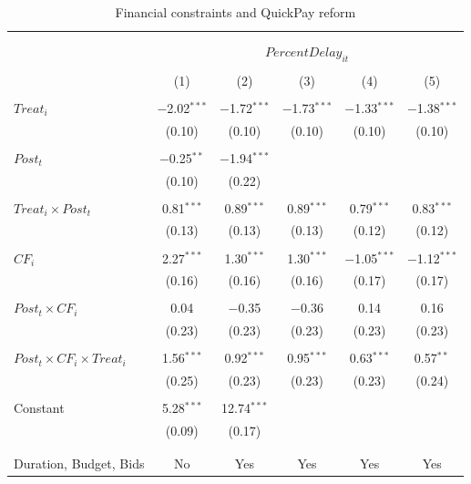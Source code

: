 \documentclass[
]{article}
\begin{document}
\begin{table}[H] \centering 
  \caption{Financial constraints and QuickPay reform} 
  \label{} 
\small 
\begin{tabular}{@{\extracolsep{-2pt}}lccccc} 
\\[-1.8ex]\hline 
\hline \\[-1.8ex] 
\\[-1.8ex] & \multicolumn{5}{c}{$PercentDelay_{it}$  } \\ 
\\[-1.8ex] & (1) & (2) & (3) & (4) & (5)\\ 
\hline \\[-1.8ex] 
 $Treat_i$ & $-$2.02$^{***}$ & $-$1.72$^{***}$ & $-$1.73$^{***}$ & $-$1.33$^{***}$ & $-$1.38$^{***}$ \\ 
  & (0.10) & (0.10) & (0.10) & (0.10) & (0.10) \\ 
  & & & & & \\ 
 $Post_t$ & $-$0.25$^{**}$ & $-$1.94$^{***}$ &  &  &  \\ 
  & (0.10) & (0.22) &  &  &  \\ 
  & & & & & \\ 
 $Treat_i \times Post_t$ & 0.81$^{***}$ & 0.89$^{***}$ & 0.89$^{***}$ & 0.79$^{***}$ & 0.83$^{***}$ \\ 
  & (0.13) & (0.13) & (0.13) & (0.12) & (0.12) \\ 
  & & & & & \\ 
 $CF_i$ & 2.27$^{***}$ & 1.30$^{***}$ & 1.30$^{***}$ & $-$1.05$^{***}$ & $-$1.12$^{***}$ \\ 
  & (0.16) & (0.16) & (0.16) & (0.17) & (0.17) \\ 
  & & & & & \\ 
 $Post_t \times CF_i$ & 0.04 & $-$0.35 & $-$0.36 & 0.14 & 0.16 \\ 
  & (0.23) & (0.23) & (0.23) & (0.23) & (0.23) \\ 
  & & & & & \\ 
 $Post_t \times CF_i \times Treat_i$ & 1.56$^{***}$ & 0.92$^{***}$ & 0.95$^{***}$ & 0.63$^{***}$ & 0.57$^{**}$ \\ 
  & (0.25) & (0.23) & (0.23) & (0.23) & (0.24) \\ 
  & & & & & \\ 
 Constant & 5.28$^{***}$ & 12.74$^{***}$ &  &  &  \\ 
  & (0.09) & (0.17) &  &  &  \\ 
  & & & & & \\ 
\hline \\[-1.8ex] 
Duration, Budget, Bids & No & Yes & Yes & Yes & Yes \\ 

\end{tabular}
\end{table}
\end{document}
